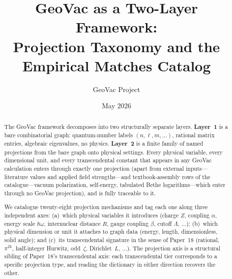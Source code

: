 \documentclass[11pt]{article}
\title{GeoVac as a Two-Layer Framework:\\
Projection Taxonomy and the Empirical Matches Catalog}
\author{GeoVac Project}
\date{May 2026}
\begin{document}
\maketitle

\begin{abstract}
The GeoVac framework decomposes into two structurally separate
layers.  \textbf{Layer~1} is a bare combinatorial graph: quantum-number
labels $(n,\ell,m,\ldots)$, rational matrix entries, algebraic
eigenvalues, no physics.  \textbf{Layer~2} is a finite family of named
projections from the bare graph onto physical settings.  Every
physical variable, every dimensional unit, and every transcendental
constant that appears in any GeoVac calculation enters through
exactly one projection (apart from external inputs---literature values and applied field
strengths---and textbook-assembly rows of the catalogue---vacuum
polarization, self-energy, tabulated Bethe logarithms---which enter
through no GeoVac projection), and is fully traceable to it.

We catalogue twenty-eight projection mechanisms and tag each one along
three independent axes: (a)~which physical variables it introduces
(charge $Z$, coupling $\alpha$, energy scale $\hbar\omega$, internuclear
distance $R$, gauge coupling $\beta$, cutoff $\Lambda$, $\ldots$);
(b)~which physical dimension or unit it attaches to graph data
(energy, length, dimensionless, solid angle); and (c)~its
transcendental signature in the sense of Paper~18 (rational, $\pi^{2k}$,
half-integer Hurwitz, odd~$\zeta$, Dirichlet~$L$, $\ldots$).  The
projection axis is a structural sibling of Paper~18's transcendental
axis: each transcendental tier corresponds to a specific projection
type, and reading the dictionary in either direction recovers the
other.


\end{abstract}
\end{document}
